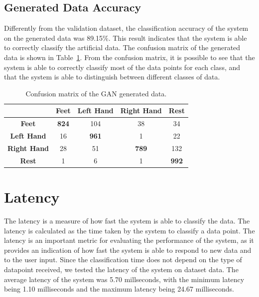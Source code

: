 \subsection*{Generated Data Accuracy}
Differently from the validation dataset, the classification accuracy of the system on the generated data was 89.15\%.
This result indicates that the system is able to correctly classify the artificial data.
The confusion matrix of the generated data is shown in Table~\ref{tab:gan_confusion_matrix}.
From the confusion matrix, it is possible to see that the system is able to correctly classify most of the data points for each class, and that the system is able to distinguish between different classes of data.
\begin{table}[!htbp]
    \centering
    \begin{tabular}{|c||c|c|c|c|}
        \hline
        & \textbf{Feet} & \textbf{Left Hand} & \textbf{Right Hand} & \textbf{Rest} \\
        \hline
        \hline
        \textbf{Feet} & \textbf{824} & 104 & 38 & 34 \\
        \hline
        \textbf{Left Hand} & 16 & \textbf{961} & 1 & 22 \\
        \hline
        \textbf{Right Hand} & 28 & 51 & \textbf{789} & 132 \\
        \hline
        \textbf{Rest} & 1 & 6 & 1 & \textbf{992} \\
        \hline
    \end{tabular}
    \caption{Confusion matrix of the GAN generated data.}\label{tab:gan_confusion_matrix}
\end{table}


\section{Latency}
The latency is a measure of how fast the system is able to classify the data.
The latency is calculated as the time taken by the system to classify a data point.
The latency is an important metric for evaluating the performance of the system, as it provides an indication of how fast the system is able to respond to new data and to the user input.
Since the classification time does not depend on the type of datapoint received, we tested the latency of the system on dataset data.
The average latency of the system was 5.70 millseconds, with the minimum latency being 1.10 milliseconds and the maximum latency being 24.67 milliseconds.

